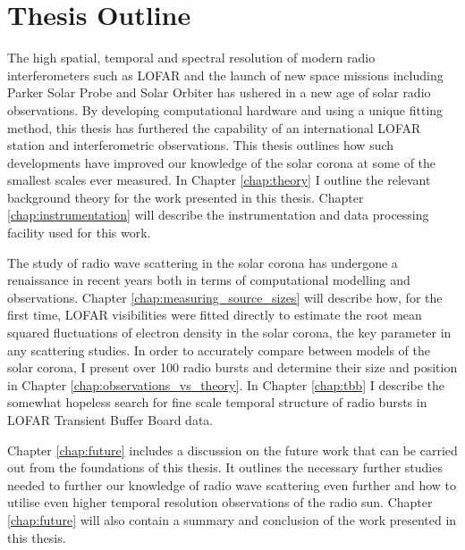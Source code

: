 \section{Thesis Outline}
The high spatial, temporal and spectral resolution of modern radio interferometers such as LOFAR and the launch of new space missions including Parker Solar Probe and Solar Orbiter has ushered in a new age of solar radio observations. By developing computational hardware and using a unique fitting method, this thesis has furthered the capability of an international LOFAR station and interferometric observations. This thesis outlines how such developments have improved our knowledge of the solar corona at some of the smallest scales ever measured. In Chapter \ref{chap:theory} I outline the relevant background theory for the work presented in this thesis. Chapter \ref{chap:instrumentation} will describe the instrumentation and data processing facility used for this work. 
 
The study of radio wave scattering in the solar corona has undergone a renaissance in recent years both in terms of computational modelling and observations. Chapter \ref{chap:measuring_source_sizes} will describe how, for the first time, LOFAR visibilities were fitted directly to estimate the root mean squared fluctuations of electron density in the solar corona, the key parameter in any scattering studies. In order to accurately compare between models of the solar corona, I present over 100 radio bursts and determine their size and position in Chapter \ref{chap:observations_vs_theory}. In Chapter \ref{chap:tbb} I describe the somewhat hopeless search for fine scale temporal structure of radio bursts in LOFAR Transient Buffer Board data.

Chapter \ref{chap:future} includes a discussion on the future work that can be carried out from the foundations of this thesis. It outlines the necessary further studies needed to further our knowledge of radio wave scattering even further  and how to utilise even higher temporal resolution observations of the radio sun. Chapter \ref{chap:future} will also contain a summary and conclusion of the work presented in this thesis.










































